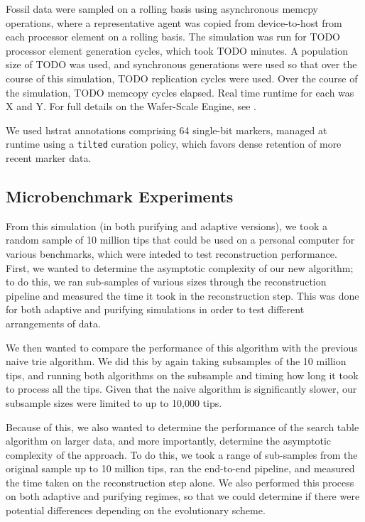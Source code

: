 Fossil data were sampled on a rolling basis using asynchronous memcpy operations, where a representative agent was copied from device-to-host from each processor element on a rolling basis.
The simulation was run for TODO processor element generation cycles, which took TODO minutes.
A population size of TODO was used, and synchronous generations were used so that over the course of this simulation, TODO replication cycles were used.
Over the course of the simulation, TODO memcopy cycles elapsed.
Real time runtime for each was X and Y.
For full details on the Wafer-Scale Engine, see \citep{moreno2024trackable}.

We used hstrat annotations comprising 64 single-bit markers, managed at runtime using a \texttt{tilted} curation policy, which favors dense retention of more recent marker data.

\subsection{Microbenchmark Experiments}

From this simulation (in both purifying and adaptive versions), we took a random sample of 10 million tips that could be used on a personal computer for various benchmarks, which were inteded to test reconstruction performance.
First, we wanted to determine the asymptotic complexity of our new algorithm; to do this, we ran sub-samples of various sizes through the reconstruction pipeline and measured the time it took in the reconstruction step.
This was done for both adaptive and purifying simulations in order to test different arrangements of data.

We then wanted to compare the performance of this algorithm with the previous naive trie algorithm. We did this by again taking subsamples of the 10 million tips, and running both algorithms on the subsample and timing how long it took to process all the tips. Given that the naive algorithm is significantly slower, our subsample sizes were limited to up to 10,000 tips. 

Because of this, we also wanted to determine the performance of the search table algorithm on larger data, and more importantly, determine the asymptotic complexity of the approach. 
To do this, we took a range of sub-samples from the original sample up to 10 million tips, ran the end-to-end pipeline, and measured the time taken on the reconstruction step alone.
We also performed this process on both adaptive and purifying regimes, so that we could determine if there were potential differences depending on the evolutionary scheme.

